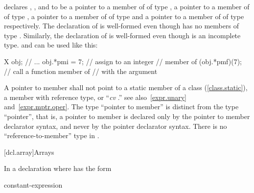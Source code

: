 declares
,
,
and
to be a pointer to a member of
of type
,
a pointer to a member of
of type
,
a pointer to a member of
of type
and a pointer to a member of
of type
respectively.
The declaration of
is well-formed even though
has no members of type
.
Similarly, the declaration of
is well-formed even though
is an incomplete type.
and
can be used like this:

\begin{codeblock}
X obj;
// ...
obj.*pmi = 7;			// assign  to an integer
				// member of 
(obj.*pmf)(7);			// call a function member of 
				// with the argument 
\end{codeblock}
\exitexampleb

\pnum
A pointer to member shall not point to a static member
of a class (\ref{class.static}),
a member with reference type,
or
``\textit{cv}
.''
\enternote
see also~\ref{expr.unary} and~\ref{expr.mptr.oper}.
The type ``pointer to member'' is distinct from the type ``pointer'',
that is, a pointer to member is declared only by the pointer to member
declarator syntax, and never by the pointer declarator syntax.
There is no ``reference-to-member'' type in \Cpp.
\exitnote

[dcl.array]{Arrays}%

\pnum
In a declaration
where
has the form

\begin{ncsimplebnf}
\terminal{D1 [} constant-expression\opt \terminal{]}
\end{ncsimplebnf}

